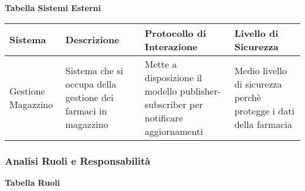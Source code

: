 \textbf{Tabella Sistemi Esterni}
\hfill \break

\begin{tabular} {|P{2.5cm}|P{4cm}|P{4cm}|P{4.5cm}|}
    \hline
    \textbf{Sistema}              & \textbf{Descrizione}                                          & \textbf{Protocollo di Interazione}                                                & \textbf{Livello di Sicurezza}                                    \\
    \hline
    Gestione \linebreak Magazzino & Sistema che si occupa della gestione dei farmaci in magazzino & Mette a disposizione il modello publisher-subscriber per notificare aggiornamenti & Medio livello di sicurezza perchè protegge i dati della farmacia \\
    \hline
\end{tabular}
\hfill \break

\newpage
\subsubsection{Analisi Ruoli e Responsabilità}
\hfill \break

\textbf{Tabella Ruoli}
\hfill \break

